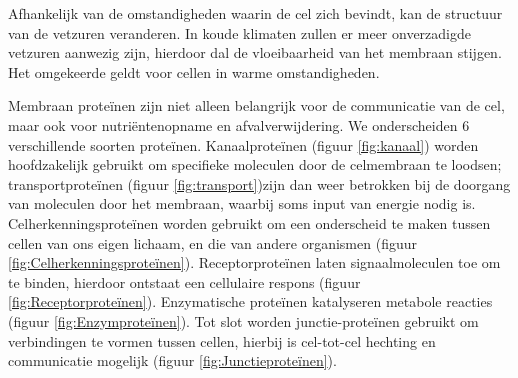 \documentclass[a4paper,kul]{kulakarticle} %
\begin{document}
Afhankelijk van de omstandigheden waarin de cel zich bevindt, kan de structuur van de vetzuren veranderen. In koude klimaten zullen er meer onverzadigde vetzuren aanwezig zijn, hierdoor dal de vloeibaarheid van het membraan stijgen. Het omgekeerde geldt voor cellen in warme omstandigheden. 

Membraan proteïnen zijn niet alleen belangrijk voor de communicatie van de cel, maar ook voor nutriëntenopname en afvalverwijdering. We onderscheiden 6 verschillende soorten proteïnen. Kanaalproteïnen (figuur \ref{fig:kanaal}) worden hoofdzakelijk gebruikt om specifieke moleculen door de celmembraan te loodsen; transportproteïnen (figuur \ref{fig:transport})zijn dan weer betrokken bij de doorgang van moleculen door het membraan, waarbij soms input van energie nodig is. Celherkenningsproteïnen worden gebruikt om een onderscheid te maken tussen cellen van ons eigen lichaam, en die van andere organismen (figuur \ref{fig:Celherkenningsproteïnen}). Receptorproteïnen laten signaalmoleculen toe om te binden, hierdoor ontstaat een cellulaire respons (figuur \ref{fig:Receptorproteïnen}). Enzymatische proteïnen katalyseren metabole reacties (figuur \ref{fig:Enzymproteïnen}). Tot slot worden junctie-proteïnen gebruikt om verbindingen te vormen tussen cellen, hierbij is cel-tot-cel hechting en communicatie mogelijk (figuur \ref{fig:Junctieproteïnen}).
\end{document}
